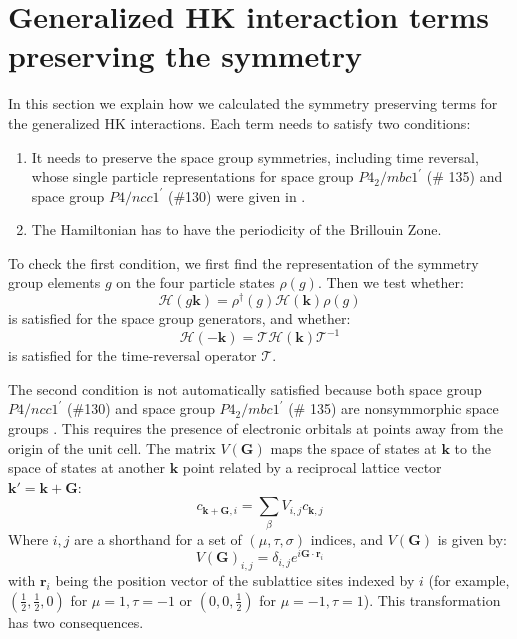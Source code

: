 \documentclass[prb,aps,amssymb,twocolumn,notitlepage]{revtex4-2}
\begin{document}
\section{Generalized HK interaction terms preserving the symmetry}
\label{sec:symmetry}
In this section we explain how we calculated the symmetry preserving terms for the generalized HK interactions. 
Each term needs to satisfy two conditions:
\begin{enumerate}
    \item It needs to preserve the space group symmetries, including time reversal, whose single particle representations for space group $P4_2/mbc1^\prime$ (\# 135) and space group $P4/ncc1^\prime$ (\#130) were given in .
    \item The Hamiltonian has to have the periodicity of the Brillouin Zone.
\end{enumerate}
To check the first condition, we first find the representation of the symmetry group elements $g$ on the four particle states $\rho(g)$. 
Then we test whether:
\begin{equation}
\mathcal{H}(g\mathbf{k})=\rho^\dagger(g)\mathcal{H}(\mathbf{k})\rho(g)
\label{eq:symmetrycondition}
\end{equation}
is satisfied for the space group generators, and whether:
\begin{equation}
\mathcal{H}(-\mathbf{k})=\mathcal{T}\mathcal{H}(\mathbf{k})\mathcal{T}^{-1}
\label{eq:trcondition}
\end{equation}
is satisfied for the time-reversal operator $\mathcal{T}$. 

The second condition is not automatically satisfied because both space group $P4/ncc1^\prime$ (\#130) and space group $P4_2/mbc1^\prime$ (\# 135) are nonsymmorphic space groups \cite{wieder2018wallpaper}. 
This requires the presence of electronic orbitals at points away from the origin of the unit cell. 
The matrix $V(\mathbf{G})$ maps the space of states at $\mathbf{k}$ to the space of states at another $\mathbf{k}$ point related by a reciprocal lattice vector $\mathbf{k}'=\mathbf{k}+\mathbf{G}$:
\begin{equation}
    c_{\mathbf{k}+\mathbf{G},i}=\sum_{\beta}V_{i,j}c_{\mathbf{k},j}
\end{equation}
Where $i,j$ are a shorthand for a set of $(\mu,\tau,\sigma)$ indices, and $V(\mathbf{G})$ is given by:
\begin{equation}
V(\mathbf{G})_{i,j}=\delta_{i,j}e^{i\mathbf{G}\cdot\mathbf{r}_{i}}
\end{equation}
with $\mathbf{r}_{i}$ being the position vector of the sublattice sites indexed by $i$ (for example, $(\tfrac{1}{2},\tfrac{1}{2},0)$ for $\mu=1,\tau=-1$ or $(0,0,\tfrac{1}{2})$ for $\mu=-1,\tau=1$). 
This transformation has two consequences. 
\end{document}
